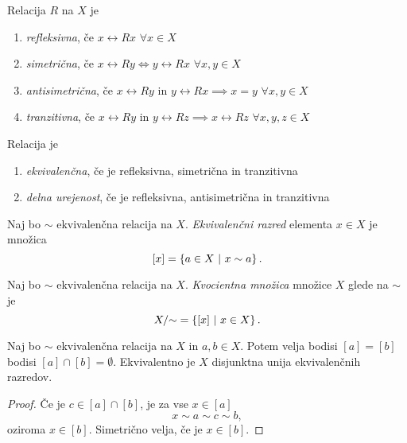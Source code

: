 \documentclass[12pt, a4paper]{article}
\begin{document}
\begin{definicija}
Relacija $R$ na $X$ je

\begin{enumerate}[label=\roman*)]
\item \emph{refleksivna}, če $x\rel{R}x$ $\forall x\in X$
\item \emph{simetrična}, če $x\rel{R}y\iff y\rel{R}x$ $\forall x,y\in X$
\item \emph{antisimetrična}, če $x\rel{R}y$ in $y\rel{R}x\implies x=y$ $\forall x,y\in X$
\item \emph{tranzitivna}, če $x\rel{R}y$ in $y\rel{R}z\implies x\rel{R}z$ $\forall x,y,z\in X$
\end{enumerate}
\end{definicija}

\begin{definicija}
Relacija je

\begin{enumerate}[label=\roman*)]
\item \emph{ekvivalenčna}, če je refleksivna, simetrična in tranzitivna
\item \emph{delna urejenost}, če je refleksivna, antisimetrična in tranzitivna
\end{enumerate}
\end{definicija}

\begin{definicija}
Naj bo $\sim$ ekvivalenčna relacija na $X$. \emph{Ekvivalenčni razred} elementa $x\in X$ je množica
\[
[x]=\left\{a\in X~\middle\vert~x\sim a\right\}.
\]
\end{definicija}

\begin{definicija}
Naj bo $\sim$ ekvivalenčna relacija na $X$. \emph{Kvocientna množica} množice $X$ glede na $\sim$ je
\[
X/{\sim} =\left\{[x]~\middle\vert~x\in X\right\}.
\]
\end{definicija}

\begin{trditev}
Naj bo $\sim$ ekvivalenčna relacija na $X$ in $a,b\in X$. Potem velja bodisi $[a]=[b]$ bodisi $[a]\cap[b]=\emptyset$. Ekvivalentno je $X$ disjunktna unija ekvivalenčnih razredov.
\end{trditev}

\begin{proof}
Če je $c\in [a]\cap[b]$, je za vse $x\in[a]$
\[
x\sim a\sim c\sim b,
\]
oziroma $x\in[b]$. Simetrično velja, če je $x\in[b]$.
\end{proof}
\end{document}
